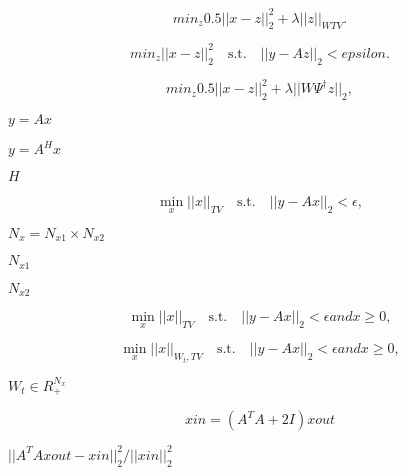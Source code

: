 \documentclass{article}
\begin{document}
\[ min_{z} 0.5||x - z||_2^2 + \lambda||z||_{WTV}. \]
\pagebreak

\[ min_{z} ||x - z||_2^2 \quad \mbox{s.t.} \quad ||y - A z||_2 < epsilon. \]
\pagebreak

\[ min_{z} 0.5||x - z||_2^2 + \lambda ||W\Psi^\dagger z||_2, \]
\pagebreak

$y = A x$
\pagebreak

$y = A^H x$
\pagebreak

$H$
\pagebreak

\[ \min_{x} ||x||_{TV} \quad \mbox{s.t.} \quad ||y - A x||_2 < \epsilon, \]
\pagebreak

$N_x=N_{x1}\times N_{x2}$
\pagebreak

$N_{x1}$
\pagebreak

$N_{x2}$
\pagebreak

\[ \min_{x} ||x||_{TV} \quad \mbox{s.t.} \quad ||y - A x||_2 < \epsilon and x \geq 0, \]
\pagebreak

\[ \min_{x} ||x||_{W_t,TV} \quad \mbox{s.t.} \quad ||y - A x||_2 < \epsilon and x \geq 0, \]
\pagebreak

$ W_t \in R_{+}^{N_x}$
\pagebreak

\[ xin = (A^{T}A + 2I)xout \]
\pagebreak

$||A^{T}Axout-xin||_2^2/||xin||_2^2$
\pagebreak
\end{document}
